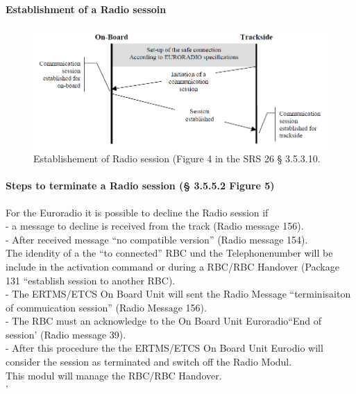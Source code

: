\documentclass{template/openetcs_report}
\begin{document}
\paragraph{Establishment of a Radio sessoin}
\begin{figure}[hbtp]
\centering
\includegraphics [scale=0.5]{images/EstablishmentofRadioSession}
\caption{Establishement of Radio session (Figure 4 in the SRS 26 § 3.5.3.10.}
\end{figure}
\newpage

\paragraph{Steps to terminate a Radio session (§ 3.5.5.2 Figure 5)}
For the Euroradio it is possible to decline the Radio session if\\
- a message to decline is received from the track (Radio message 156).\\
- After received message ``no compatible version'' (Radio message 154).\\
The idendity of a the ``to connected'' RBC und the Telephonenumber will be include in the activation command or during a RBC/RBC Handover (Package 131 ``establish session to another RBC).\\
- The ERTMS/ETCS On Board Unit will sent the Radio Message ``terminisaiton of commuication session'' (Radio Message 156).\\
- The RBC must an acknowledge to the On Board Unit Euroradio``End of session' (Radio message 39).\\
- After this procedure the the ERTMS/ETCS On Board Unit Eurodio will consider the session as terminated and switch off the Radio Modul.\\
This modul will manage the RBC/RBC Handover.\\
' 
\end{document}
